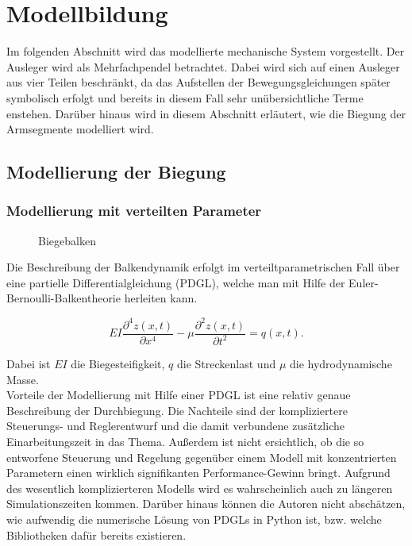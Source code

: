 \chapter{Modellbildung}
Im folgenden Abschnitt wird das modellierte mechanische System vorgestellt. 
Der Ausleger wird als Mehrfachpendel betrachtet. Dabei wird sich auf einen Ausleger aus vier Teilen beschränkt, da das Aufstellen der Bewegungsgleichungen später symbolisch erfolgt und bereits in diesem Fall sehr unübersichtliche Terme enstehen. Darüber hinaus wird in diesem Abschnitt erläutert, wie die Biegung der Armsegmente modelliert wird.

\section{Modellierung der Biegung}
\subsection{Modellierung mit verteilten Parameter}

\begin{figure}[h!]
\centering
\def\svgscale{0.8}

\caption{Biegebalken}
\label{fig:VertPara}
\end{figure}

Die Beschreibung der Balkendynamik erfolgt im verteiltparametrischen Fall über \mbox{eine} partielle Differentialgleichung (PDGL), welche man mit Hilfe der Euler-Bernoulli-Balkentheorie herleiten kann. 

\begin{equation}
EI\dfrac{\partial^4 z(x,t)}{\partial x^4}-\mu \dfrac{\partial^2 z(x,t)}{\partial t^2} = q(x,t).
\end{equation}

Dabei ist $EI$ die Biegesteifigkeit, $q$ die Streckenlast und $\mu$ die hydrodynamische Masse.\\
Vorteile der Modellierung mit Hilfe einer PDGL ist eine relativ genaue Beschreibung der Durchbiegung. Die Nachteile sind der kompliziertere Steuerungs- und Reglerentwurf und die damit verbundene zusätzliche Einarbeitungszeit in das Thema. Außerdem ist nicht ersichtlich, ob die so entworfene Steuerung und Regelung gegenüber einem Modell mit konzentrierten Parametern einen wirklich signifikanten Performance-Gewinn bringt. Aufgrund des wesentlich komplizierteren Modells wird es wahrscheinlich auch zu längeren Simulationszeiten kommen. Darüber hinaus können die Autoren nicht abschätzen, wie aufwendig die numerische Lösung von PDGLs in Python ist, bzw. welche Bibliotheken dafür bereits existieren.


